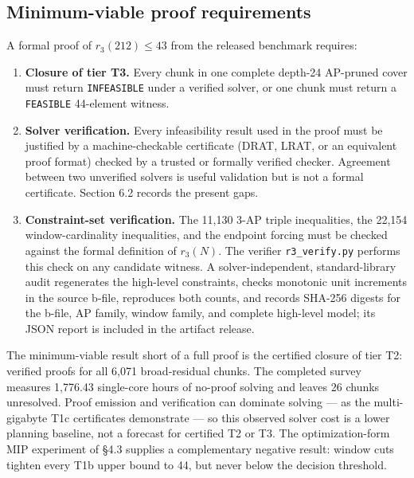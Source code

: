 \subsection{Minimum-viable proof requirements}\label{minimum-viable-proof-requirements}

A formal proof of $r_3(212)\leq 43$ from the released benchmark requires:

\begin{enumerate}
\def\labelenumi{\arabic{enumi}.}
\tightlist
\item
  \textbf{Closure of tier T3.} Every chunk in one complete depth-24
  AP-pruned cover must return \texttt{INFEASIBLE} under a verified solver, or one
  chunk must return a \texttt{FEASIBLE} 44-element witness.
\item
  \textbf{Solver verification.} Every infeasibility result used in the proof
  must be justified by a machine-checkable certificate (DRAT, LRAT, or an
  equivalent proof format) checked by a trusted or formally verified checker.
  Agreement between two unverified solvers is useful validation but is not a
  formal certificate. Section 6.2 records the present gaps.
\item
  \textbf{Constraint-set verification.} The 11,130 3-AP triple
  inequalities, the 22,154 window-cardinality inequalities, and
  the endpoint forcing must be checked against the formal
  definition of $r_3(N)$. The verifier \texttt{r3\_verify.py} performs
  this check on any candidate witness. A solver-independent, standard-library
  audit regenerates the high-level constraints, checks monotonic unit
  increments in the source b-file, reproduces both counts, and records
  SHA-256 digests for the b-file, AP family, window family, and complete
  high-level model; its JSON report is included in the artifact release.
\end{enumerate}

The minimum-viable result short of a full proof is the certified closure of
tier T2: verified proofs for all 6,071 broad-residual chunks. The completed
survey measures 1,776.43 single-core hours of no-proof solving and leaves 26
chunks unresolved. Proof emission and verification can dominate solving ---
as the multi-gigabyte T1c certificates demonstrate --- so this observed
solver cost is a lower planning baseline, not a forecast for certified T2
or T3. The optimization-form MIP experiment of §4.3 supplies a complementary
negative result: window cuts tighten every T1b upper bound to 44, but never
below the decision threshold.

